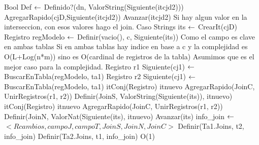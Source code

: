{			\State Bool Def $\leftarrow$ Definido?(dn, ValorString(Siguiente(itcjd2)))
				AgregarRapido(cjD,Siguiente(itcjd2))
		     \EndIf
			\State	Avanzar(itcjd2)
		\EndWhile
	\EndIf
	\State Si hay algun valor en la interseccion, con esos valores hago el join.
		\State Caso Strings
		\State its $\leftarrow$ CrearIt(cjD) 
		 
			\State	Registro regModelo $\leftarrow$ Definir(vacio(), c, Siguiente(its))
			\State	Como el campo es clave en ambas tablas
			\State	Si en ambas tablas hay indice en base a c y la complejidad es 
			\State	O(L+Log(n*m)) sino es O(cardinal de registros de la tabla)
			\State	Asumimos que es el mejor caso para la complejidad.
			\State Registro r1 Siguiente(cj1) $\leftarrow$ BuscarEnTabla(regModelo, ta1)
			\State Registro r2 Siguiente(cj1) $\leftarrow$ BuscarEnTabla(regModelo, ta1)
				\State itConj(Registro) itnuevo AgregarRapido(JoinC, UnirRegistros(r1, r2))
				\State Definir(JoinS, ValorString(Siguiente(its)), itnuevo)
			\Else
				\State itConj(Registro) itnuevo AgregarRapido(JoinC, UnirRegistros(r1, r2))
				\State Definir(JoinN, ValorNat(Siguiente(its), itnuevo)
			\EndIf
			\State Avanzar(its)
		\EndWhile
	\EndIf
	\State info\_join $\leftarrow$ $<Rcambios, campoJ, campoT, JoinS, JoinN, JoinC>$
	\State Definir(Ta1.Joins, t2, info\_join)
	\State Definir(Ta2.Joins, t1, info\_join)
}{O(1)}
